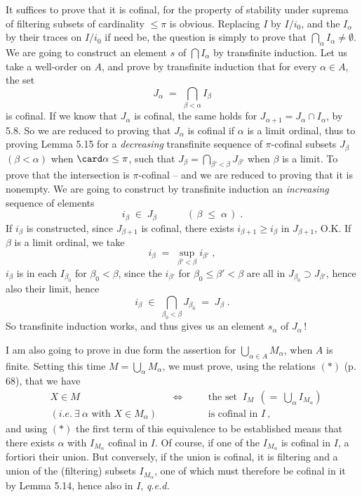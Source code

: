 It suffices to prove that it is cofinal, for the property of stability under suprema of filtering subsets of cardinality $\leq \pi$ is obvious. Replacing $I$ by $I/i_{0}$, and the $I_{\alpha}$ by their traces on $I/i_{0}$ if need be, the question is simply to prove that $\bigcap_{\alpha} I_{\alpha} \neq \emptyset$. We are going to construct an element $s$ of $\bigcap I_{\alpha}$ by transfinite induction. Let us take a well-order on $A$, and prove by transfinite induction
that for every $\alpha \in A$, the set
\[
J_{\alpha} \;=\; \bigcap_{\beta<\alpha} I_{\beta}
\]
is cofinal. If we know that $J_{\alpha}$ is cofinal, the same holds for $J_{\alpha+1} = J_{\alpha} \cap I_{\alpha}$, by 5.8. So we are reduced to proving that $J_{\alpha}$ is cofinal if $\alpha$ is a limit ordinal, thus to proving Lemma 5.15 for a \textit{decreasing} transfinite sequence of $\pi$-cofinal subsets $J_{\beta}$ $(\beta < \alpha)$ when $\card \alpha \leq \pi$, such that $J_{\beta} = \bigcap_{\beta'<\beta} J_{\beta'}$ when $\beta$ is a limit. To prove that the intersection is $\pi$-cofinal -- and we are reduced to proving that it is nonempty. We are going to construct by transfinite induction an \textit{increasing} sequence of elements
\[
i_{\beta} \;\in\; J_{\beta} \qquad\quad (\, \beta \;\leq\; \alpha \,) \; .
\]
If $i_{\beta}$ is constructed, since $J_{\beta+1}$ is cofinal, there exists $i_{\beta+1} \geq i_{\beta}$ in $J_{\beta+1}$, O.K. If $\beta$ is a limit ordinal, we take
\[
i_{\beta} \;=\; \sup_{\beta'<\beta} i_{\beta'} \; ,
\]
$i_{\beta}$ is in each $I_{\beta_{0}}$ for $\beta_{0} < \beta$,
since the $i_{\beta'}$ for $\beta_{0} \leq \beta' < \beta$ are all in $J_{\beta_{0}} \supset J_{\beta'}$, hence also their limit, hence
\[
i_{\beta} \;\in\; \bigcap_{\beta_{0}<\beta} J_{\beta_{0}} \;=\; J_{\beta} \; .
\]
So transfinite induction works, and thus gives us an element $s_{\alpha}$ of $J_{\alpha}$\,!

I am also going to prove in due form the assertion for $\bigcup_{\alpha\in A} M_{\alpha}$, when $A$ is finite. Setting this time $M = \bigcup_{\alpha} M_{\alpha}$, we must prove, using the relations $(*)$ (p. 68), that we have
\[
\begin{aligned}
&X \in M &&\Longleftrightarrow \quad &&\text{the set } \ I_{M} \ \ (= \ \textstyle\bigcup_{\alpha} I_{M_{\alpha}})\\
&(\textit{i.e.} \ \exists \ \alpha \text{ with } X \in M_{\alpha}) && &&\text{is cofinal in } I \ ,
\end{aligned}
\tag*{$(**)$}
\]
and using $(*)$ the first term of this equivalence to be established means that there exists $\alpha$ with $I_{M_{\alpha}}$ cofinal in $I$. Of course, if one of the $I_{M_{\alpha}}$ is cofinal in $I$, a fortiori their union. But conversely, if the union is cofinal, it is filtering and a union of the (filtering) subsets $I_{M_{\alpha}}$, one of which must therefore be cofinal in it by Lemma 5.14, hence also in $I$, \textit{q.e.d.}

